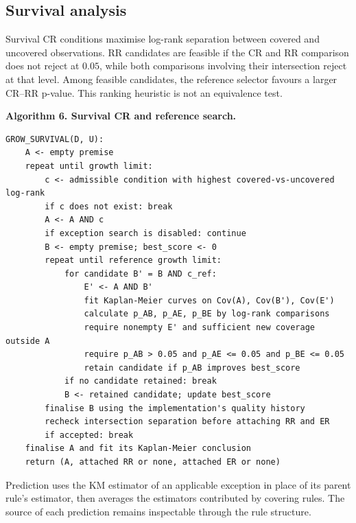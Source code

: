 \subsection{Survival analysis}
\label{algorithm-survival-analysis}
Survival CR conditions maximise log-rank separation between covered and
uncovered observations. RR candidates are feasible if the CR and RR comparison
does not reject at \(0.05\), while both comparisons involving their
intersection reject at that level. Among feasible candidates, the reference
selector favours a larger CR--RR p-value. This ranking heuristic is not an
equivalence test.

\noindent\begin{minipage}{\linewidth}
\textbf{Algorithm 6. Survival CR and reference search.}


\begin{Verbatim}[fontsize=\scriptsize,frame=single,samepage=true]
GROW_SURVIVAL(D, U):
    A <- empty premise
    repeat until growth limit:
        c <- admissible condition with highest covered-vs-uncovered log-rank
        if c does not exist: break
        A <- A AND c
        if exception search is disabled: continue
        B <- empty premise; best_score <- 0
        repeat until reference growth limit:
            for candidate B' = B AND c_ref:
                E' <- A AND B'
                fit Kaplan-Meier curves on Cov(A), Cov(B'), Cov(E')
                calculate p_AB, p_AE, p_BE by log-rank comparisons
                require nonempty E' and sufficient new coverage outside A
                require p_AB > 0.05 and p_AE <= 0.05 and p_BE <= 0.05
                retain candidate if p_AB improves best_score
            if no candidate retained: break
            B <- retained candidate; update best_score
        finalise B using the implementation's quality history
        recheck intersection separation before attaching RR and ER
        if accepted: break
    finalise A and fit its Kaplan-Meier conclusion
    return (A, attached RR or none, attached ER or none)
\end{Verbatim}
\end{minipage}
Prediction uses the KM estimator of an applicable exception in place of its
parent rule's estimator, then averages the estimators contributed by covering
rules. The source of each prediction remains
inspectable through the rule structure.




